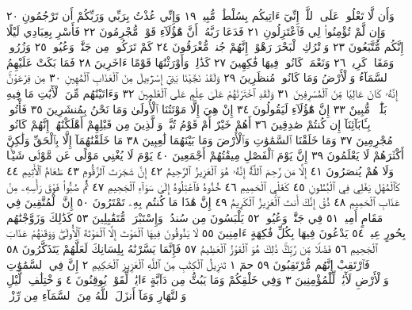 وَأَن لَّا تَعْلُوا۟ عَلَى ٱللَّهِۖ إِنِّيٓ ءَاتِيكُم بِسُلْطَٰنࣲ مُّبِينࣲ ١٩ وَإِنِّي عُذْتُ
بِرَبِّي وَرَبِّكُمْ أَن تَرْجُمُونِ ٢٠ وَإِن لَّمْ تُؤْمِنُوا۟ لِي فَٱعْتَزِلُونِ ٢١
فَدَعَا رَبَّهُۥٓ أَنَّ هَٰٓؤُلَآءِ قَوْمࣱ مُّجْرِمُونَ ٢٢ فَأَسْرِ بِعِبَادِي لَيْلًا إِنَّكُم
مُّتَّبَعُونَ ٢٣ وَٱتْرُكِ ٱلْبَحْرَ رَهْوًاۖ إِنَّهُمْ جُندࣱ مُّغْرَقُونَ ٢٤ كَمْ
تَرَكُوا۟ مِن جَنَّٰتࣲ وَعُيُونࣲ ٢٥ وَزُرُوعࣲ وَمَقَامࣲ كَرِيمࣲ ٢٦ وَنَعْمَةࣲ
كَانُوا۟ فِيهَا فَٰكِهِينَ ٢٧ كَذَٰلِكَۖ وَأَوْرَثْنَٰهَا قَوْمًا ءَاخَرِينَ ٢٨ فَمَا
بَكَتْ عَلَيْهِمُ ٱلسَّمَآءُ وَٱلْأَرْضُ وَمَا كَانُوا۟ مُنظَرِينَ ٢٩ وَلَقَدْ
نَجَّيْنَا بَنِيٓ إِسْرَٰٓءِيلَ مِنَ ٱلْعَذَابِ ٱلْمُهِينِ ٣٠ مِن فِرْعَوْنَۚ إِنَّهُۥ
كَانَ عَالِيࣰا مِّنَ ٱلْمُسْرِفِينَ ٣١ وَلَقَدِ ٱخْتَرْنَٰهُمْ عَلَىٰ عِلْمٍ عَلَى
ٱلْعَٰلَمِينَ ٣٢ وَءَاتَيْنَٰهُم مِّنَ ٱلْأٓيَٰتِ مَا فِيهِ بَلَٰٓؤࣱا۟ مُّبِينٌ ٣٣
إِنَّ هَٰٓؤُلَآءِ لَيَقُولُونَ ٣٤ إِنْ هِيَ إِلَّا مَوْتَتُنَا ٱلْأُولَىٰ وَمَا نَحْنُ
بِمُنشَرِينَ ٣٥ فَأْتُوا۟ بِـَٔابَآئِنَآ إِن كُنتُمْ صَٰدِقِينَ ٣٦ أَهُمْ
خَيْرٌ أَمْ قَوْمُ تُبَّعࣲ وَٱلَّذِينَ مِن قَبْلِهِمْ أَهْلَكْنَٰهُمْۚ إِنَّهُمْ كَانُوا۟
مُجْرِمِينَ ٣٧ وَمَا خَلَقْنَا ٱلسَّمَٰوَٰتِ وَٱلْأَرْضَ وَمَا بَيْنَهُمَا لَٰعِبِينَ ٣٨
مَا خَلَقْنَٰهُمَآ إِلَّا بِٱلْحَقِّ وَلَٰكِنَّ أَكْثَرَهُمْ لَا يَعْلَمُونَ ٣٩
إِنَّ يَوْمَ ٱلْفَصْلِ مِيقَٰتُهُمْ أَجْمَعِينَ ٤٠ يَوْمَ لَا يُغْنِي
مَوْلًى عَن مَّوْلࣰى شَيْـࣰٔا وَلَا هُمْ يُنصَرُونَ ٤١ إِلَّا مَن رَّحِمَ ٱللَّهُۚ
إِنَّهُۥ هُوَ ٱلْعَزِيزُ ٱلرَّحِيمُ ٤٢ إِنَّ شَجَرَتَ ٱلزَّقُّومِ ٤٣
طَعَامُ ٱلْأَثِيمِ ٤٤ كَٱلْمُهْلِ يَغْلِي فِي ٱلْبُطُونِ ٤٥
كَغَلْيِ ٱلْحَمِيمِ ٤٦ خُذُوهُ فَٱعْتِلُوهُ إِلَىٰ سَوَآءِ
ٱلْجَحِيمِ ٤٧ ثُمَّ صُبُّوا۟ فَوْقَ رَأْسِهِۦ مِنْ عَذَابِ
ٱلْحَمِيمِ ٤٨ ذُقْ إِنَّكَ أَنتَ ٱلْعَزِيزُ ٱلْكَرِيمُ ٤٩
إِنَّ هَٰذَا مَا كُنتُم بِهِۦ تَمْتَرُونَ ٥٠ إِنَّ ٱلْمُتَّقِينَ
فِي مَقَامٍ أَمِينࣲ ٥١ فِي جَنَّٰتࣲ وَعُيُونࣲ ٥٢ يَلْبَسُونَ
مِن سُندُسࣲ وَإِسْتَبْرَقࣲ مُّتَقَٰبِلِينَ ٥٣ كَذَٰلِكَ
وَزَوَّجْنَٰهُم بِحُورٍ عِينࣲ ٥٤ يَدْعُونَ فِيهَا بِكُلِّ
فَٰكِهَةٍ ءَامِنِينَ ٥٥ لَا يَذُوقُونَ فِيهَا ٱلْمَوْتَ إِلَّا
ٱلْمَوْتَةَ ٱلْأُولَىٰۖ وَوَقَىٰهُمْ عَذَابَ ٱلْجَحِيمِ ٥٦ فَضْلࣰا مِّن
رَّبِّكَۚ ذَٰلِكَ هُوَ ٱلْفَوْزُ ٱلْعَظِيمُ ٥٧ فَإِنَّمَا يَسَّرْنَٰهُ بِلِسَانِكَ
لَعَلَّهُمْ يَتَذَكَّرُونَ ٥٨ فَٱرْتَقِبْ إِنَّهُم مُّرْتَقِبُونَ ٥٩
حمٓ ١ تَنزِيلُ ٱلْكِتَٰبِ مِنَ ٱللَّهِ ٱلْعَزِيزِ ٱلْحَكِيمِ ٢ إِنَّ فِي ٱلسَّمَٰوَٰتِ
وَٱلْأَرْضِ لَأٓيَٰتࣲ لِّلْمُؤْمِنِينَ ٣ وَفِي خَلْقِكُمْ وَمَا يَبُثُّ مِن دَآبَّةٍ ءَايَٰتࣱ لِّقَوْمࣲ
يُوقِنُونَ ٤ وَٱخْتِلَٰفِ ٱلَّيْلِ وَٱلنَّهَارِ وَمَآ أَنزَلَ ٱللَّهُ مِنَ ٱلسَّمَآءِ مِن رِّزْقࣲ
